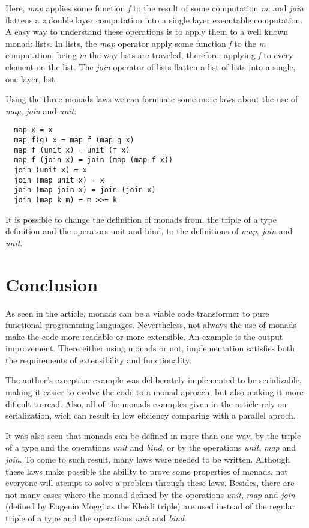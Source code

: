 \documentclass[twocolumn,10pt]{article}
\begin{document}
Here, \textit{map} applies some function \textit{f} to the result of some computation \textit{m}; and \textit{join} flattens a \textit{z} double layer computation into a single layer executable computation. A easy way to understand these operations is to apply them to a well known monad: lists. In lists, the \textit{map} operator apply some function \textit{f} to the \textit{m} computation, being \textit{m} the way lists are traveled, therefore, applying \textit{f} to every element on the list. The \textit{join} operator of lists flatten a list of lists into a single, one layer, list.

Using the three monads laws we can formuate some more laws about the use of \textit{map}, \textit{join} and \textit{unit}:

\lstset{language=Haskell}
\begin{lstlisting}
  map x = x
  map f(g) x = map f (map g x)
  map f (unit x) = unit (f x)
  map f (join x) = join (map (map f x))
  join (unit x) = x
  join (map unit x) = x
  join (map join x) = join (join x)
  join (map k m) = m >>= k
\end{lstlisting}

It is possible to change the definition of monads from, the triple of a type definition and the operators unit and bind, to the definitions of \textit{map}, \textit{join} and \textit{unit}.

\section{Conclusion}

As seen in the article, monads can be a viable code transformer to pure functional programming languages. Nevertheless, not always the use of monads make the code more readable or more extensible. An example is the output improvement. There either using monads or not, implementation satisfies both the requirements of extensibility and functionality. 

The author's exception example was deliberately implemented to be serializable, making it easier to evolve the code to a monad aproach, but also making it more dificult to read. Also, all of the monads examples given in the article rely on serialization, wich can result in low eficiency comparing with a parallel aproch.

It was also seen that monads can be defined in more than one way, by the triple of a type and the operations \textit{unit} and \textit{bind}, or by the operations \textit{unit}, \textit{map} and \textit{join}. To come to such result, many laws were needed to be written. Although these laws make possible the ability to prove some properties of monads, not everyone will atempt to solve a problem through these laws. Besides, there are not many cases where the monad defined by the operations \textit{unit}, \textit{map} and \textit{join} (defined by Eugenio Moggi as the Kleisli triple) are used instead of the regular triple of a type and the operations \textit{unit} and \textit{bind}.
\end{document}
